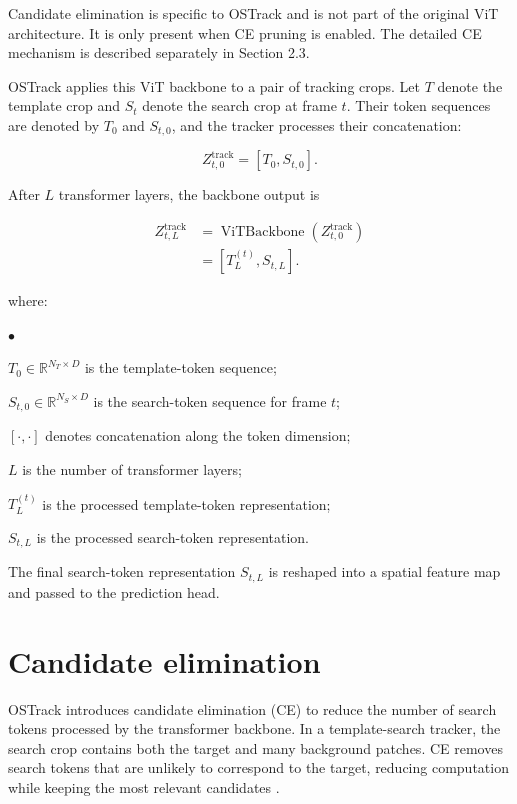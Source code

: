 \documentclass[bachelorthesis]{fer}
\numberwithin{equation}{chapter}
\newcommand{\FormulaNotationWith}[2]{%
    \vspace{-0.6em}
    \noindent\hspace*{1.2em}%
    \begin{minipage}{0.90\textwidth}
        \footnotesize
        #1
        \vspace{0.2em}
        \begin{list}{\(\bullet\)}{
            \setlength{\leftmargin}{1.4em}
            \setlength{\labelwidth}{0.8em}
            \setlength{\labelsep}{0.5em}
            \setlength{\itemsep}{0.05em}
            \setlength{\parsep}{0pt}
            \setlength{\topsep}{0.25em}
            \setlength{\partopsep}{0pt}
        }
            #2
        \end{list}
    \end{minipage}
    \par
    \vspace{0.8em}

}
\newcommand{\FormulaNotation}[1]{\FormulaNotationWith{where:}{#1}}
\begin{document}
    Candidate elimination is specific to OSTrack and is not part of the original ViT architecture. It is only present when
    CE pruning is enabled. The detailed CE mechanism is described separately in Section 2.3.

    OSTrack applies this ViT backbone to a pair of tracking crops. Let \(T\) denote the template crop and \(S_t\) denote the
    search crop at frame \(t\). Their token sequences are denoted by \(T_0\) and \(S_{t,0}\), and the tracker processes their
    concatenation:

    \begin{equation}
        Z_{t,0}^{\mathrm{track}} = [T_0, S_{t,0}].
    \end{equation}

    After \(L\) transformer layers, the backbone output is

    \begin{equation}
        \begin{aligned}
            Z_{t,L}^{\mathrm{track}}
            &=
            \operatorname{ViTBackbone}\left(Z_{t,0}^{\mathrm{track}}\right)
            \\
            &=
            [T_L^{(t)}, S_{t,L}].
        \end{aligned}
    \end{equation}
    \FormulaNotation{
        \item \(T_0 \in \mathbb{R}^{N_T \times D}\) is the template-token sequence;
        \item \(S_{t,0} \in \mathbb{R}^{N_S \times D}\) is the search-token sequence for frame \(t\);
        \item \([\cdot,\cdot]\) denotes concatenation along the token dimension;
        \item \(L\) is the number of transformer layers;
        \item \(T_L^{(t)}\) is the processed template-token representation;
        \item \(S_{t,L}\) is the processed search-token representation.
    }

    The final search-token representation \(S_{t,L}\) is reshaped into a spatial feature map and passed to the prediction
    head.


    \section{Candidate elimination}\label{candidate-elimination}

    OSTrack introduces candidate elimination (CE) to reduce the number of search tokens processed by the transformer
    backbone. In a template-search tracker, the search crop contains both the target and many background patches. CE removes
    search tokens that are unlikely to correspond to the target, reducing computation while keeping the most relevant
    candidates \cite{ye2022ostrack}.
\end{document}
